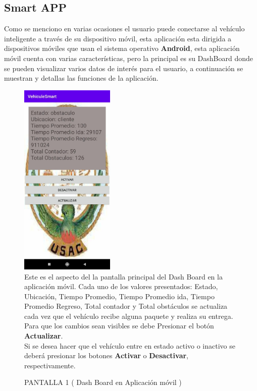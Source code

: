 \documentclass[osajnl,twocolumn,showpacs,superscriptaddress,10pt]{revtex4-1}
\begin{document}
\subsection{Smart APP}
    Como se menciono en varias ocasiones el usuario puede conectarse al vehículo inteligente a través de su dispositivo móvil, esta aplicación esta dirigida a dispositivos móviles que usan el sistema operativo \textbf{Android}, esta aplicación móvil cuenta con varias características, pero la principal es su DashBoard donde se pueden visualizar varios datos de interés para el usuario, a continuación se muestran y detallas las funciones de la aplicación.
    
\begin{figure} [H] \centering 
\caption{PANTALLA 1 ( Dash Board en Aplicación móvil )}
\includegraphics[width=0.4\textwidth]{img1.jpeg} 
\\
Este es el aspecto del la pantalla principal del Dash Board en la aplicación móvil. Cada uno de los valores presentados: Estado, Ubicación, Tiempo Promedio, Tiempo Promedio ida, Tiempo Promedio Regreso, Total contador y Total obstáculos se actualiza cada vez que el vehículo recibe alguna paquete y realiza su entrega.
Para que los cambios sean visibles se debe Presionar el botón \textbf{Actualizar}.\\
Si se desea hacer que el vehículo entre en estado activo o inactivo se deberá presionar los botones \textbf{Activar} o \textbf{Desactivar}, respectivamente.
\end{figure}
\\
\end{document}
